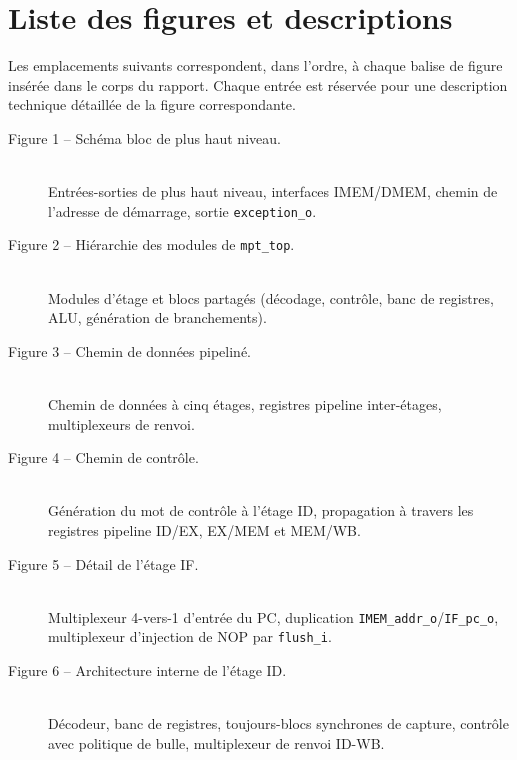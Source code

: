 \documentclass[11pt,a4paper,oneside]{report}
\begin{document}
\appendix
\chapter{Liste des figures et descriptions}
\label{app:figures}

\noindent Les emplacements suivants correspondent, dans l'ordre, à
chaque balise de figure insérée dans le corps du
rapport. Chaque entrée est réservée pour une description technique
détaillée de la figure correspondante.

\begin{description}
  \item[Figure 1  --  Schéma bloc de plus haut niveau.]\hfill\\
        Entrées-sorties de plus haut niveau, interfaces IMEM/DMEM,
        chemin de l'adresse de démarrage, sortie
        \texttt{exception\_o}.

  \item[Figure 2  --  Hiérarchie des modules de
        \texttt{mpt\_top}.]\hfill\\
        Modules d'étage et blocs partagés (décodage, contrôle, banc
        de registres, ALU, génération de branchements).

  \item[Figure 3  --  Chemin de données pipeliné.]\hfill\\
        Chemin de données à cinq étages, registres pipeline
        inter-étages, multiplexeurs de renvoi.

  \item[Figure 4  --  Chemin de contrôle.]\hfill\\
        Génération du mot de contrôle à l'étage ID, propagation à
        travers les registres pipeline ID/EX, EX/MEM et MEM/WB.

  \item[Figure 5  --  Détail de l'étage IF.]\hfill\\
        Multiplexeur 4-vers-1 d'entrée du PC, duplication
        \texttt{IMEM\_addr\_o}/\texttt{IF\_pc\_o}, multiplexeur
        d'injection de NOP par \texttt{flush\_i}.

  \item[Figure 6  --  Architecture interne de l'étage ID.]\hfill\\
        Décodeur, banc de registres, toujours-blocs synchrones de
        capture, contrôle avec politique de bulle, multiplexeur de
        renvoi ID-WB.


\end{description}
\end{document}
